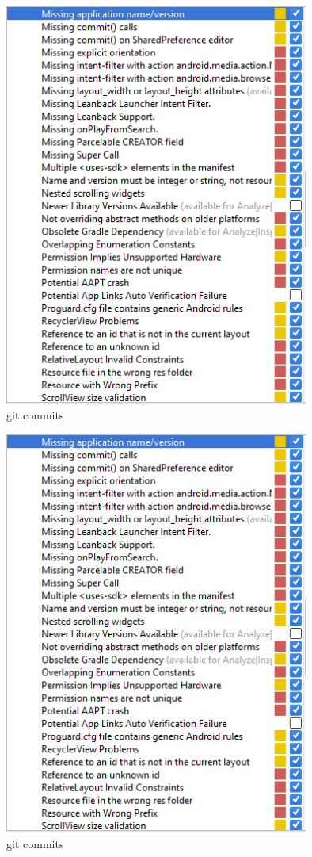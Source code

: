 \begin{figure}[H]
  		\centering
      	\includegraphics[width=100mm]{Capture13}	      	
  		\caption{git commits}
\end{figure}

\begin{figure}[H]
  		\centering
      	\includegraphics[width=100mm]{Capture14}	      	
  		\caption{git commits}
\end{figure}

